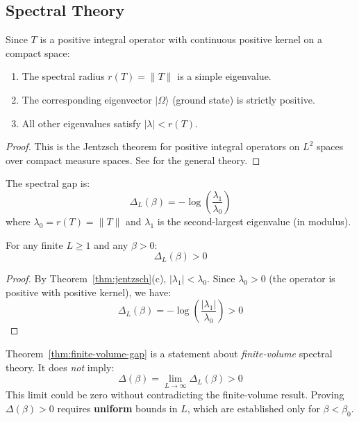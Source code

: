 \subsection{Spectral Theory}

\begin{theorem}
\label{thm:jentzsch}
\label{thm:discrete}
\label{thm:perron-frobenius}
Since $T$ is a positive integral operator with continuous positive kernel on a 
compact space:
\begin{enumerate}[label=(\alph*)]
    \item The spectral radius $r(T) = \|T\|$ is a simple eigenvalue.
    \item The corresponding eigenvector $|\Omega\rangle$ (ground state) is strictly positive.
    \item All other eigenvalues satisfy $|\lambda| < r(T)$.
\end{enumerate}
\end{theorem}

\begin{proof}
This is the Jentzsch theorem for positive integral operators on $L^2$ spaces over 
compact measure spaces. See \cite{Schaefer1974} for the general theory.
\end{proof}

\begin{definition}
\label{def:spectral-gap}
The spectral gap is:
\[
\Delta_L(\beta) = -\log\left(\frac{\lambda_1}{\lambda_0}\right)
\]
where $\lambda_0 = r(T) = \|T\|$ and $\lambda_1$ is the second-largest eigenvalue 
(in modulus).
\end{definition}

\begin{theorem}
\label{thm:finite-volume-gap}
For any finite $L \geq 1$ and any $\beta > 0$:
\[
\Delta_L(\beta) > 0
\]
\end{theorem}

\begin{proof}
By Theorem~\ref{thm:jentzsch}(c), $|\lambda_1| < \lambda_0$. Since $\lambda_0 > 0$ 
(the operator is positive with positive kernel), we have:
\[
\Delta_L(\beta) = -\log\left(\frac{|\lambda_1|}{\lambda_0}\right) > 0
\]
\end{proof}

\begin{remark}[Limitation]
Theorem~\ref{thm:finite-volume-gap} is a statement about \emph{finite-volume} 
spectral theory. It does \emph{not} imply:
\[
\Delta(\beta) = \lim_{L \to \infty} \Delta_L(\beta) > 0
\]
This limit could be zero without contradicting the finite-volume result. Proving 
$\Delta(\beta) > 0$ requires \textbf{uniform} bounds in $L$, which are established 
only for $\beta < \beta_0$.
\end{remark}

